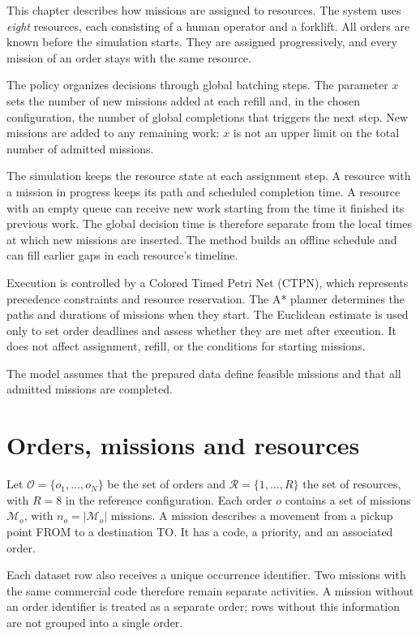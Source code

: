 This chapter describes how missions are assigned to resources. The system uses
\textit{eight} resources, each consisting of a human operator and a forklift.
All orders are known before the simulation starts. They are assigned
progressively, and every mission of an order stays with the same resource.

The policy organizes decisions through global batching steps. The parameter
$x$ sets the number of new missions added at each refill and, in the chosen
configuration, the number of global completions that triggers the next step.
New missions are added to any remaining work: $x$ is not an upper limit on the
total number of admitted missions.

The simulation keeps the resource state at each assignment step. A resource
with a mission in progress keeps its path and scheduled completion time.
A resource with an empty queue can receive new work starting from the time
it finished its previous work. The global decision time is therefore separate
from the local times at which new missions are inserted. The method builds an
offline schedule and can fill earlier gaps in each resource's timeline.

Execution is controlled by a Colored Timed Petri Net (CTPN), which represents
precedence constraints and resource reservation. The A* planner determines the
paths and durations of missions when they start. The Euclidean estimate is used
only to set order deadlines and assess whether they are met after execution.
It does not affect assignment, refill, or the conditions for starting missions.

The model assumes that the prepared data define feasible missions and that all
admitted missions are completed.

\section{Orders, missions and resources}
\label{sec:progetto-modello}

Let $\mathcal O=\{o_1,\ldots,o_N\}$ be the set of orders and
$\mathcal R=\{1,\ldots,R\}$ the set of resources, with $R=8$ in the reference
configuration. Each order $o$ contains a set of missions $\mathcal M_o$, with
$n_o=|\mathcal M_o|$ missions. A mission describes a movement from a pickup point
FROM to a destination TO. It has a code, a priority, and an associated order.

Each dataset row also receives a unique occurrence identifier. Two missions
with the same commercial code therefore remain separate activities. A mission
without an order identifier is treated as a separate order; rows without this
information are not grouped into a single order.

